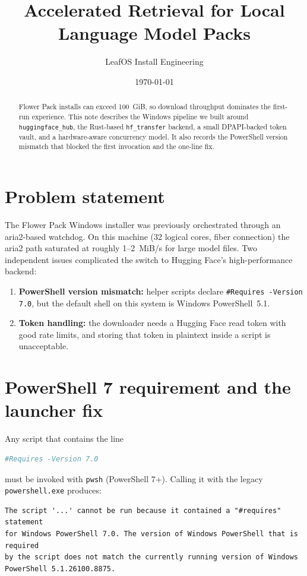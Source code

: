 \documentclass[11pt,a4paper]{article}
\title{Accelerated Retrieval for Local Language Model Packs}
\author{LeafOS Install Engineering}
\date{\today}
\begin{document}
\maketitle

\begin{abstract}
Flower Pack installs can exceed 100~GiB, so download throughput dominates the first-run experience.  This note describes the Windows pipeline we built around \texttt{huggingface\_hub}, the Rust-based \texttt{hf\_transfer} backend, a small DPAPI-backed token vault, and a hardware-aware concurrency model.  It also records the PowerShell version mismatch that blocked the first invocation and the one-line fix.
\end{abstract}

\tableofcontents
\newpage

\section{Problem statement}
The Flower Pack Windows installer was previously orchestrated through an aria2-based watchdog.  On this machine (32 logical cores, fiber connection) the aria2 path saturated at roughly 1--2~MiB/s for large model files.  Two independent issues complicated the switch to Hugging Face's high-performance backend:

\begin{enumerate}
  \item \textbf{PowerShell version mismatch:} helper scripts declare \texttt{\#Requires -Version 7.0}, but the default shell on this system is Windows PowerShell~5.1.
  \item \textbf{Token handling:} the downloader needs a Hugging Face read token with good rate limits, and storing that token in plaintext inside a script is unacceptable.
\end{enumerate}

\section{PowerShell 7 requirement and the launcher fix}
Any script that contains the line
\begin{lstlisting}[language=bash]
#Requires -Version 7.0
\end{lstlisting}
must be invoked with \texttt{pwsh} (PowerShell 7+).  Calling it with the legacy \texttt{powershell.exe} produces:

\begin{lstlisting}
The script '...' cannot be run because it contained a "#requires" statement
for Windows PowerShell 7.0. The version of Windows PowerShell that is required
by the script does not match the currently running version of Windows
PowerShell 5.1.26100.8875.
\end{lstlisting}
\end{document}
